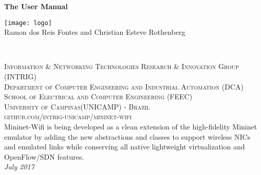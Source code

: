 \documentclass[11pt,fleqn]{book} %
\begin{document}
\begingroup
\thispagestyle{empty}


\vspace*{1cm}
\centering
\par\normalfont\fontsize{35}{35}\sffamily\selectfont
\centering
\textbf{The User Manual}\\
{\LARGE }\par %
\vspace*{4cm}
\centering
\texttt{[image: logo]} %
\\
\vspace*{3cm}
{\large Ramon dos Reis Fontes and Christian Esteve Rothenberg }\par %
\endgroup


\newpage
~\vfill
\thispagestyle{empty}

\noindent \textsc{Information \& Networking Technologies Research \& Innovation Group  (INTRIG)} \\
\noindent \textsc{Department of Computer Engineering and Industrial Automation (DCA)}\\
\noindent \textsc{School of Electrical and Computer Engineering (FEEC)}\\
\noindent \textsc{University of Campinas(UNICAMP) - Brazil}\\

\noindent \textsc{github.com/intrig-unicamp/mininet-wifi}\\ %

\noindent Mininet-Wifi is being developed as a clean extension of the  high-fidelity Mininet emulator by adding the new abstractions and classes to support wireless NICs and emulated links while conserving all native lightweight virtualization and OpenFlow/SDN features.\\ %

\noindent \textit{July 2017} %



\pagestyle{empty} %
\end{document}
